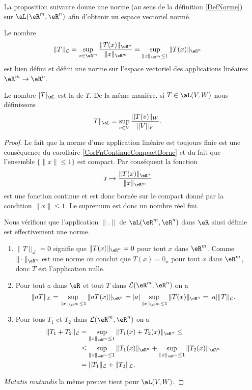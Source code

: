 La proposition suivante donne une norme (au sens de la définition \ref{DefNorme}) sur $\aL(\eR^m,\eR^n)$ afin d'obtenir un espace vectoriel normé.
\begin{proposition}		\label{DefNormeAppLineaire}
    Le nombre
	\begin{equation}
		\|T\|_{\mathcal{L}}=\sup_{x\in\eR^m}\frac{\|T(x)\|_{\eR^n}}{\|x\|_{\eR^m}}=\sup_{\|x\|_{\eR^m}\leq 1}\|T(x)\|_{\eR^n}
	\end{equation}
    est bien défini et défini une norme sur l'espace vectoriel des applications linéaires \( \eR^m\to \eR^n\).
\end{proposition}
Le nombre \( | T |_{\aL}\) est la  de $T$. De la même manière, si $T\in\aL(V,W)$ nous définissons
\begin{equation}
    T \|_{\aL}=\sup_{v\in V}\frac{ \| T(v) \|_W }{ \| V \|_V }.
\end{equation}

\begin{proof}
    Le fait que la norme d'une application linéaire est toujours finie est une conséquence du corollaire \ref{CorFnContinueCompactBorne} et du fait que l'ensemble $\{ \| x \|\leq 1 \}$ est compact. Par conséquent la fonction
    \begin{equation}
        x\mapsto \frac{ \| T(x) \|_{\eR^n} }{ \| x \|_{\eR^m} }
    \end{equation}
    est une fonction continue et est donc bornée sur le compact donné par la condition $\| x \|\leq 1$. Le supremum est donc un nombre réel fini.
        
    Nous vérifions que l'application $\| . \|$ de $\aL(\eR^m,\eR^n)$ dans $\eR$ ainsi définie est effectivement une norme.
    \begin{enumerate}
    \item $\|T\|_{\mathcal{L}}=0$ signifie que $\|T(x)\|_{\eR^n}=0$ pour tout $x$ dans $\eR^m$. Comme  $\|\cdot\|_{\eR^n}$ est une norme on conclut que $T(x)=0_{n}$ pour tout $x$ dans $\eR^m$, donc $T$ est l'application nulle. 
    \item Pour tout $a$ dans $\eR$ et tout  $T$ dans $\mathcal{L}(\eR^m, \eR^n)$ on a 
    \[
    \|aT\|_{\mathcal{L}}=\sup_{\|x\|_{\eR^m}\leq 1}\|aT(x)\|_{\eR^n}=|a|\sup_{\|x\|_{\eR^m}\leq 1}\|T(x)\|_{\eR^n}=|a|\|T\|_{\mathcal{L}}.
    \]
    \item Pour tous $T_1$ et $T_2$ dans $\mathcal{L}(\eR^m, \eR^n)$ on a 
      \begin{equation}\nonumber
        \begin{aligned}
           \|T_1+ T_2\|_{\mathcal{L}}&=\sup_{\|x\|_{\eR^m}\leq 1}\|T_1(x)+T_2(x)\|_{\eR^n}\leq\\
     &\leq\sup_{\|x\|_{\eR^m}\leq 1}\|T_1(x)\|_{\eR^n} +\sup_{\|x\|_{\eR^m}\leq 1}\|T_2(x)\|_{\eR^n}\\
     &=\|T_1\|_{\mathcal{L}}+\|T_2\|_{\mathcal{L}}.
        \end{aligned}
      \end{equation}
    \end{enumerate}
    \emph{Mutatis mutandis} la même preuve tient pour $\aL(V,W)$.

\end{proof}

